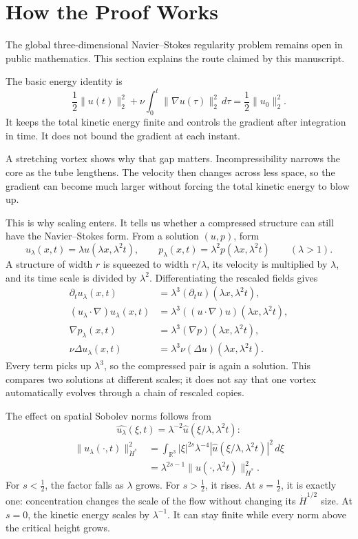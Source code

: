 \section*{How the Proof Works}

The global three-dimensional Navier--Stokes regularity problem remains open in
public mathematics. This section explains the route claimed by this manuscript.

The basic energy identity is
\[
\frac12\|u(t)\|_2^2
+\nu\int_0^t\|\nabla u(\tau)\|_2^2\,d\tau
=\frac12\|u_0\|_2^2.
\]
It keeps the total kinetic energy finite and controls the gradient after
integration in time. It does not bound the gradient at each instant.

A stretching vortex shows why that gap matters. Incompressibility narrows the
core as the tube lengthens. The velocity then changes across less space, so the
gradient can become much larger without forcing the total kinetic energy to
blow up.

This is why scaling enters. It tells us whether a compressed structure can
still have the Navier--Stokes form. From a solution \((u,p)\), form
\[
u_\lambda(x,t)=\lambda u(\lambda x,\lambda^2t),
\qquad
p_\lambda(x,t)=\lambda^2p(\lambda x,\lambda^2t)
\qquad (\lambda>1).
\]
A structure of width \(r\) is squeezed to width \(r/\lambda\), its velocity is
multiplied by \(\lambda\), and its time scale is divided by \(\lambda^2\).
Differentiating the rescaled fields gives
\[
\begin{aligned}
\partial_tu_\lambda(x,t)
&=\lambda^3(\partial_tu)(\lambda x,\lambda^2t),\\
(u_\lambda\!\cdot\nabla)u_\lambda(x,t)
&=\lambda^3((u\!\cdot\nabla)u)(\lambda x,\lambda^2t),\\
\nabla p_\lambda(x,t)
&=\lambda^3(\nabla p)(\lambda x,\lambda^2t),\\
\nu\Delta u_\lambda(x,t)
&=\lambda^3\nu(\Delta u)(\lambda x,\lambda^2t).
\end{aligned}
\]
Every term picks up \(\lambda^3\), so the compressed pair is again a solution.
This compares two solutions at different scales; it does not say that one
vortex automatically evolves through a chain of rescaled copies.

The effect on spatial Sobolev norms follows from
\[
\widehat{u_\lambda}(\xi,t)
=\lambda^{-2}\widehat u(\xi/\lambda,\lambda^2t):
\]
\[
\begin{aligned}
\|u_\lambda(\cdot,t)\|_{\dot H^s}^2
&=\int_{\mathbb R^3}|\xi|^{2s}\lambda^{-4}
  |\widehat u(\xi/\lambda,\lambda^2t)|^2\,d\xi\\
&=\lambda^{2s-1}
  \|u(\cdot,\lambda^2t)\|_{\dot H^s}^2.
\end{aligned}
\]
For \(s<\tfrac12\), the factor falls as \(\lambda\) grows. For
\(s>\tfrac12\), it rises. At \(s=\tfrac12\), it is exactly one: concentration
changes the scale of the flow without changing its \(\dot H^{1/2}\) size. At
\(s=0\), the kinetic energy scales by \(\lambda^{-1}\). It can stay finite
while every norm above the critical height grows.

